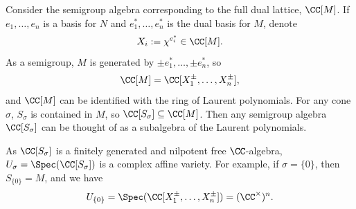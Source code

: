 \documentclass[12pt]{amsart}
\theoremstyle{plain}
\begin{document}
Consider the semigroup algebra corresponding to the full dual lattice, $\CC[M]$.
If $e_1, \ldots, e_n$ is a basis for $N$ and $e_1^*, \ldots, e_n^*$ is the dual basis for $M$, denote
$$X_i := \chi^{e_i^*} \in \CC[M].$$
As a semigroup, $M$ is generated by $\pm e_1^*, \ldots, \pm e_n^*$, so
$$\CC[M] = \CC[X_1^\pm, \ldots, X_n^\pm],$$
and $\CC[M]$ can be identified with the ring of Laurent polynomials.
For any cone $\sigma$, $S_\sigma$ is contained in $M$, so $\CC[S_\sigma]\subseteq\CC[M]$. 
Then any semigroup algebra $\CC[S_\sigma]$ can be thought of as a subalgebra of the Laurent polynomials.


As $\CC[S_\sigma]$ is a finitely generated and nilpotent free $\CC$-algebra, $U_\sigma = \Spec(\CC[S_\sigma])$ is a complex affine variety.
For example, if $\sigma = \{0\}$, then $S_{\{0\}}= M$, and we have
$$U_{\{0\}} = \Spec(\CC[X_1^\pm, \ldots, X_n^\pm]) = (\CC^\times)^n.$$
\end{document}
